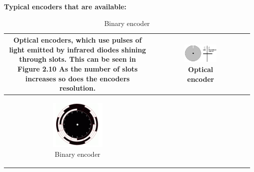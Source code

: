 \textbf{Typical encoders that are available:}  
\vspace{5mm}
\begin{table}[H]
    \vspace{-5mm}
    \centering
    \begin{tabular}{|c|c|}
    \hline
      \begin{minipage}[b]{0.49\textwidth}
      \vspace{2mm}
        \textbf{Optical encoders}, which use pulses of light emitted by infrared diodes shining through slots. This can be seen in Figure 2.10 As the number of slots increases so does the encoders resolution\cite{encoders}.
        \vspace{5mm}
      \end{minipage}
         & 
      \begin{minipage}[b]{0.49\textwidth}
      \begin{figure}[H]
        \centering
        \includegraphics[width=0.6\textwidth]{slottedencoder.png}
        \caption{Optical encoder}
        \label{fig:optical}
      \end{figure}
      \end{minipage}\\
      \hline   
      
      \begin{minipage}[b]{0.45\textwidth}
      \centering
      \begin{figure}[H]
          \centering
            \includegraphics[width=0.49\textwidth]{Graycodeencoder.png}
            \caption{Binary encoder}
            \label{fig:binenc}
      \end{figure}


\end{minipage}
\end{tabular}
\end{table}
